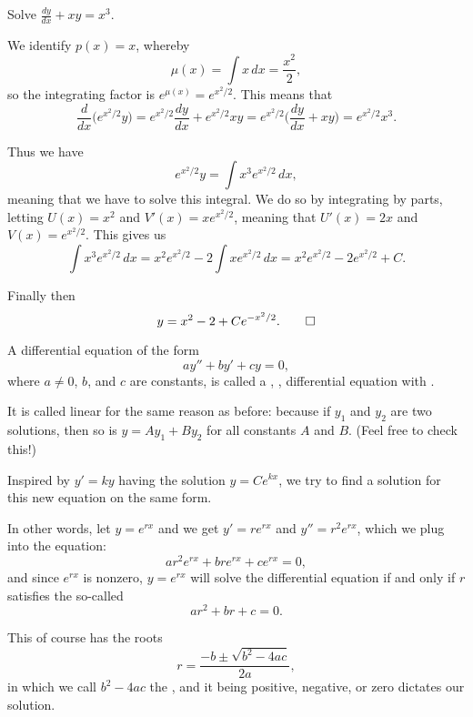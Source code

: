\begin{example}
	Solve $\frac{d y}{d x} + x y = x^3$.

	We identify $p(x) = x$, whereby
	\[
		\mu(x) = \int x \, d x = \frac{x^2}{2},
	\]
	so the integrating factor is $e^{\mu(x)} = e^{x^2 / 2}$.
	This means that
	\[
		\frac{d}{d x} \big ( e^{x^2 / 2} y \big ) = e^{x^2 / 2} \frac{d y}{d x} + e^{x^2 / 2} x y = e^{x^2 / 2} \Big ( \frac{d y}{d x} + x y \Big ) = e^{x^2 / 2} x^3.
	\]

	\noindent
	Thus we have
	\[
		e^{x^2 / 2} y = \int x^3 e^{x^2 / 2} \, d x,
	\]
	meaning that we have to solve this integral.
	We do so by integrating by parts, letting $U(x) = x^2$ and $V'(x) = x e^{x^2 / 2}$, meaning that $U'(x) = 2 x$ and $V(x) = e^{x^2 / 2}$.
	This gives us
	\[
		\int x^3 e^{x^2 / 2} \, d x = x^2 e^{x^2 / 2} - 2 \int x e^{x^2 / 2} \, d x = x^2 e^{x^2 / 2} - 2 e^{x^2 / 2} + C.
	\]

	\noindent
	Finally then
	\[
		y = x^2 - 2 + C e^{-x^2 / 2}. \qedhere
	\]
\end{example}


A differential equation of the form
\[
	a y'' + b y' + c y = 0,
\]
where $a \neq 0$, $b$, and $c$ are constants, is called a , ,  differential equation with .

It is called linear for the same reason as before: because if $y_1$ and $y_2$ are two solutions, then so is $y = A y_1 + B y_2$ for all constants $A$ and $B$.
(Feel free to check this!)

Inspired by $y' = k y$ having the solution $y = C e^{k x}$, we try to find a solution for this new equation on the same form.

In other words, let $y = e^{r x}$ and we get $y' = r e^{r x}$ and $y'' = r^2 e^{r x}$, which we plug into the equation:
\[
	a r^2 e^{r x} + b r e^{r x} + c e^{r x} = 0,
\]
and since $e^{r x}$ is nonzero, $y = e^{r x}$ will solve the differential equation if and only if $r$ satisfies the so-called 
\[
	a r^2 + b r + c = 0.
\]

\noindent
This of course has the roots
\[
	r = \frac{- b \pm \sqrt{b^2 - 4 a c}}{2 a},
\]
in which we call $b^2 - 4 ac$ the , and it being positive, negative, or zero dictates our solution.

